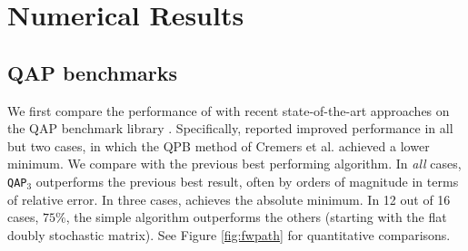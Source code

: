 \documentclass[10pt,journal,cspaper,compsoc]{IEEEtran}
\begin{document}
% 




\section{Numerical Results} %
\label{sub:numerical_results}



\subsection{QAP benchmarks}

We first compare the performance of \qapm with recent state-of-the-art approaches on the QAP benchmark library \cite{Burkard1997}.  Specifically, \cite{Zaslavskiy2009} reported improved performance in all but two cases, in which the QPB method of Cremers et al. \cite{Schellewald2001} achieved a lower minimum.  We compare \qapm with the previous best performing algorithm.  In \emph{all} cases, \texttt{QAP}$_3$ outperforms the previous best result, often by orders of magnitude in terms of relative error. In three cases, \qapb achieves the absolute minimum.  In 12 out of 16 cases, $75\%$, the simple \qapa algorithm outperforms the others (starting with the flat doubly stochastic matrix).  See Figure \ref{fig:fwpath} for quantitative comparisons.
\end{document}
